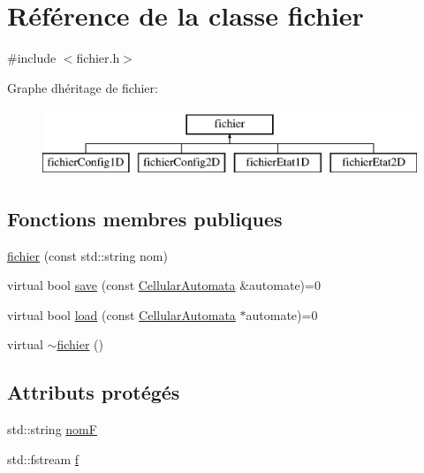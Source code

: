 \hypertarget{classfichier}{}\section{Référence de la classe fichier}
\label{classfichier}


{\ttfamily \#include $<$fichier.\+h$>$}

Graphe d\textquotesingle{}héritage de fichier\+:\begin{figure}[H]
\begin{center}
\leavevmode
\includegraphics[height=2.000000cm]{classfichier}
\end{center}
\end{figure}
\subsection*{Fonctions membres publiques}
\begin{DoxyCompactItemize}
\item 
\mbox{\hyperlink{classfichier_a42004721e8f3931e39b12a513e12f48e}{fichier}} (const std\+::string nom)
\item 
virtual bool \mbox{\hyperlink{classfichier_ac54bfc9ea8c980c0b46bb291d3abdef4}{save}} (const \mbox{\hyperlink{class_cellular_automata}{Cellular\+Automata}} \&automate)=0
\item 
virtual bool \mbox{\hyperlink{classfichier_a6c246db929cf6532eb3f12c2b39574d5}{load}} (const \mbox{\hyperlink{class_cellular_automata}{Cellular\+Automata}} $\ast$automate)=0
\item 
virtual \mbox{\hyperlink{classfichier_aa9d389401e8d59b50377c472fb37b5da}{$\sim$fichier}} ()
\end{DoxyCompactItemize}
\subsection*{Attributs protégés}
\begin{DoxyCompactItemize}
\item 
std\+::string \mbox{\hyperlink{classfichier_a5507421c34a4358be0d0f842f74293fc}{nomF}}
\item 
std\+::fstream \mbox{\hyperlink{classfichier_ad4aa9acd482d376366be3d488e6af0ad}{f}}
\end{DoxyCompactItemize}


